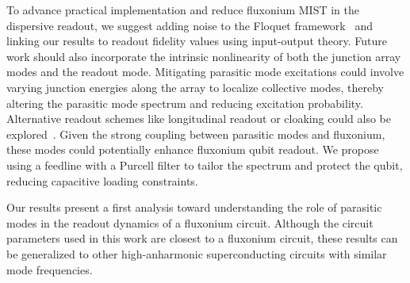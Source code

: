 \documentclass[%
reprint,
superscriptaddress,
 amsmath,amssymb,
 aps,
 prx,
longbibliography,
floatfix,
]{revtex4-2}
\newcommand{\sh}[1]{{\color{orange}{{}[SS: #1]}}}%
\begin{document}

To advance practical implementation and reduce fluxonium MIST in the dispersive readout, we suggest adding noise to the Floquet framework~\cite{huang_engineering_2021} and linking our results to readout fidelity values using input-output theory. Future work should also incorporate the intrinsic nonlinearity of both the junction array modes and the readout mode. Mitigating parasitic mode excitations could involve varying junction energies along the array to localize collective modes, thereby altering the parasitic mode spectrum and reducing excitation probability. Alternative readout schemes like longitudinal readout or cloaking could also be explored~\cite{reed_high-fidelity_2010, munoz-arias_qubit_2023, didier_fast_2015}. Given the strong coupling between parasitic modes and fluxonium, these modes could potentially enhance fluxonium qubit readout. We propose using a feedline with a Purcell filter to tailor the spectrum and protect the qubit, reducing capacitive loading constraints.


Our results present a first analysis toward understanding the role of parasitic modes in the readout dynamics of a fluxonium circuit. Although the circuit parameters used in this work are closest to a fluxonium circuit, these results can be generalized to other high-anharmonic superconducting circuits with similar mode frequencies.
\end{document}
